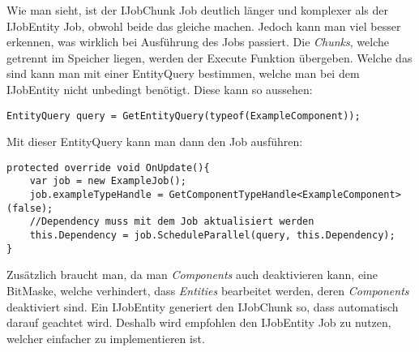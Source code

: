 Wie man sieht, ist der IJobChunk Job deutlich länger und komplexer als der IJobEntity Job, obwohl beide das gleiche machen. Jedoch kann man viel besser erkennen, was wirklich bei Ausführung des Jobs passiert. Die \textit{Chunks}, welche getrennt im Speicher liegen, werden der Execute Funktion übergeben. Welche das sind kann man mit einer EntityQuery bestimmen, welche man bei dem IJobEntity nicht unbedingt benötigt. Diese kann so aussehen:
\begin{lstlisting}[style=code, caption={EntityQuery Beispiel}, label=EntityQuery]
EntityQuery query = GetEntityQuery(typeof(ExampleComponent));
\end{lstlisting}
Mit dieser EntityQuery kann man dann den Job ausführen:
\begin{lstlisting}[style=code, caption={EntityQuery Beispiel}, label=JobExecution]
protected override void OnUpdate(){
    var job = new ExampleJob();
    job.exampleTypeHandle = GetComponentTypeHandle<ExampleComponent>(false);
    //Dependency muss mit dem Job aktualisiert werden	
    this.Dependency = job.ScheduleParallel(query, this.Dependency);
}
\end{lstlisting}
Zusätzlich braucht man, da man \textit{Components} auch deaktivieren kann, eine BitMaske, welche verhindert, dass \textit{Entities} bearbeitet werden, deren \textit{Components} deaktiviert sind. Ein IJobEntity generiert den IJobChunk so, dass automatisch darauf geachtet wird. Deshalb wird empfohlen den IJobEntity Job zu nutzen, welcher einfacher zu implementieren ist.